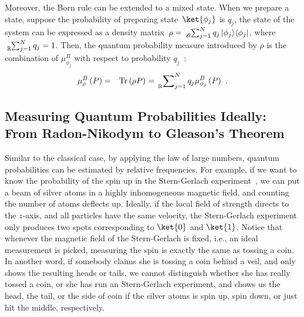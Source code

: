 \documentclass{article}
\theoremstyle{remark}
\newcommand{\Tr}{\mathop{\mathrm{Tr}}\nolimits}
\newcommand{\op}[2]{\ensuremath{\left\vert{#1}\middle\rangle\middle\langle{#2}\right\vert}}
\newcommand{\proj}[1]{\op{#1}{#1}}
\begin{document}
Moreover, the Born rule can be extended to a mixed state. When we
prepare a state, suppose the probability of preparing state~$\ket{\phi_{j}}$
is $q_{j}$, the state of the system can be expressed as a density
matrix~$\rho=\tensor*[_{\mathscr{O}}]{\sum}{_{j=1}^{N}}q_{j}\proj{\phi_{j}}$,
where $\tensor*[_{\mathbb{R}}]{\sum}{_{j=1}^{N}}q_{j}=1$. Then, the
quantum probability measure introduced by $\rho$ is the combination
of $\mu_{\phi_{j}}^{B}$ with respect to probability $q_{j}$~\cite{peres1995quantum,544199,RiederSvozil2007}:
\begin{eqnarray}
\mu_{\rho}^{B}\left(P\right) & = & \Tr\left(\rho P\right)=\sideset{_{\mathbb{R}}}{_{j=1}^{N}}\sum q_{j}\mu_{\phi_{j}}^{B}\left(P\right)\textrm{ .}\label{BornRule.mixed}
\end{eqnarray}



\subsection{Measuring Quantum Probabilities Ideally: From Radon-Nikodym to Gleason's
Theorem}

Similar to the classical case, by applying the law of large numbers,
quantum probabilities can be estimated by relative frequencies. For
example, if we want to know the probability of the spin up in the
Stern-Gerlach experiment~\cite{Stern1988,peres1995quantum,544199,Griffiths2003},
we can put a beam of silver atoms in a highly inhomogeneous magnetic
field, and counting the number of atoms deflects up. Ideally, if the
local field of strength directs to the $z$-axis, and all particles
have the same velocity, the Stern-Gerlach experiment only produces
two spots corresponding to $\ket{0}$ and $\ket{1}$. Notice that
whenever the magnetic field of the Stern-Gerlach is fixed, i.e., an
ideal measurement is picked, measuring the spin is exactly the same
as tossing a coin. In another word, if somebody claims she is tossing
a coin behind a veil, and only shows the resulting heads or tails,
we cannot distinguish whether she has really tossed a coin, or she
has run an Stern-Gerlach experiment, and shows us the head, the tail,
or the side of coin if the silver atoms is spin up, spin down, or
just hit the middle, respectively.
\end{document}
